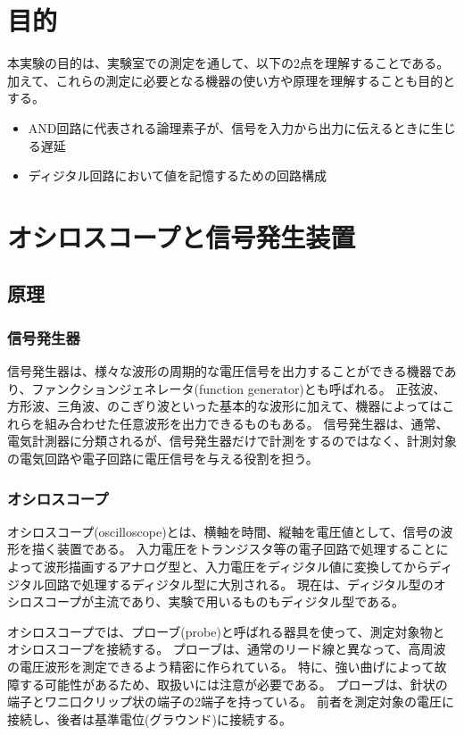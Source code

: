 \documentclass[uplatex, a4j, dvipdfmx]{jsarticle}
\begin{document}
\pagestyle{empty}


\setcounter{page}{1}
\pagestyle{fancy}

\section{目的}
本実験の目的は、実験室での測定を通して、以下の2点を理解することである。加えて、これらの測定に必要となる機器の使い方や原理を理解することも目的とする。
\begin{itemize}
    \item AND回路に代表される論理素子が、信号を入力から出力に伝えるときに生じる遅延
    \item ディジタル回路において値を記憶するための回路構成
\end{itemize}

\section{オシロスコープと信号発生装置}
\subsection{原理}
\subsubsection{信号発生器}
信号発生器は、様々な波形の周期的な電圧信号を出力することができる機器であり、ファンクションジェネレータ(function generator)とも呼ばれる。
正弦波、方形波、三角波、のこぎり波といった基本的な波形に加えて、機器によってはこれらを組み合わせた任意波形を出力できるものもある。
信号発生器は、通常、電気計測器に分類されるが、信号発生器だけで計測をするのではなく、計測対象の電気回路や電子回路に電圧信号を与える役割を担う。

\subsubsection{オシロスコープ}
オシロスコープ(oscilloscope)とは、横軸を時間、縦軸を電圧値として、信号の波形を描く装置である。
入力電圧をトランジスタ等の電子回路で処理することによって波形描画するアナログ型と、入力電圧をディジタル値に変換してからディジタル回路で処理するディジタル型に大別される。
現在は、ディジタル型のオシロスコープが主流であり、実験で用いるものもディジタル型である。

オシロスコープでは、プローブ(probe)と呼ばれる器具を使って、測定対象物とオシロスコープを接続する。
プローブは、通常のリード線と異なって、高周波の電圧波形を測定できるよう精密に作られている。
特に、強い曲げによって故障する可能性があるため、取扱いには注意が必要である。
プローブは、針状の端子とワニ口クリップ状の端子の2端子を持っている。
前者を測定対象の電圧に接続し、後者は基準電位(グラウンド)に接続する。
\end{document}
